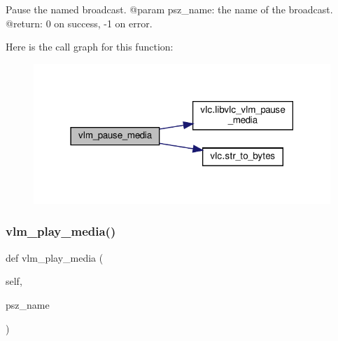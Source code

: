 \begin{DoxyVerb}Pause the named broadcast.
@param psz_name: the name of the broadcast.
@return: 0 on success, -1 on error.
\end{DoxyVerb}
 Here is the call graph for this function\+:
\nopagebreak
\begin{figure}[H]
\begin{center}
\leavevmode
\includegraphics[width=318pt]{classvlc_1_1_instance_ae29c5cbd8b89178373fae922d03c85a5_cgraph}
\end{center}
\end{figure}
\mbox{\label{classvlc_1_1_instance_a7d5047e2733ed1a7c7713bf9c097395d}} 
\subsubsection{\texorpdfstring{vlm\+\_\+play\+\_\+media()}{vlm\_play\_media()}}
{\footnotesize\ttfamily def vlm\+\_\+play\+\_\+media (\begin{DoxyParamCaption}\item[{}]{self,  }\item[{}]{psz\+\_\+name }\end{DoxyParamCaption})}


